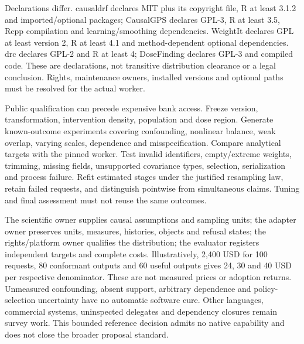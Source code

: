 Declarations differ. causaldrf declares MIT plus its copyright file, R at least
3.1.2 and imported/optional packages; CausalGPS declares GPL-3, R at least 3.5,
Rcpp compilation and learning/smoothing dependencies. WeightIt declares GPL
at least version 2, R at least 4.1 and method-dependent optional dependencies.
drc declares GPL-2 and R at least 4; DoseFinding declares GPL-3 and compiled
code. These are declarations, not transitive distribution clearance or a legal
conclusion. Rights, maintenance owners, installed versions and optional paths
must be resolved for the actual worker.
\citep{exec24_dose_causaldrf,exec24_dose_causalgps,exec24_dose_weightit,exec24_dose_drc,exec24_dose_dosefinding}

Public qualification can precede expensive bank access. Freeze version,
transformation, intervention density, population and dose region. Generate
known-outcome experiments covering confounding, nonlinear balance, weak overlap,
varying scales, dependence and misspecification. Compare analytical targets with
the pinned worker. Test invalid identifiers, empty/extreme weights, trimming,
missing fields, unsupported covariance types, selection, serialization and
process failure. Refit estimated stages under the justified resampling law,
retain failed requests, and distinguish pointwise from simultaneous claims.
Tuning and final assessment must not reuse the same outcomes.
\citep{exec24_dose_contract}

The scientific owner supplies causal assumptions and sampling units; the
adapter owner preserves units, measures, histories, objects and refusal states;
the rights/platform owner qualifies the distribution; the evaluator registers
independent targets and complete costs. Illustratively, 2,400 USD for 100
requests, 80 conformant outputs and 60 useful outputs gives 24, 30 and 40 USD
per respective denominator. These are not measured prices or adoption returns.
Unmeasured confounding, absent support, arbitrary dependence and policy-selection
uncertainty have no automatic software cure. Other languages, commercial
systems, uninspected delegates and dependency closures remain survey work.
This bounded reference decision admits no native capability and does not close
the broader proposal standard.\citep{exec24_dose_contract}
